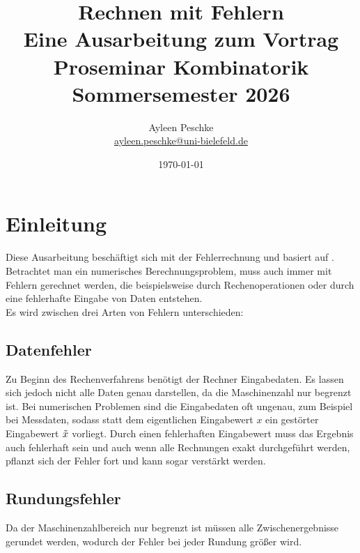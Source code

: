 \documentclass[12pt]{article}
\title{Rechnen mit Fehlern \\ [0.5em] \Large Eine Ausarbeitung zum Vortrag \\ Proseminar Kombinatorik \\ Sommersemester 2026}
\author{Ayleen Peschke \\ \url{ayleen.peschke@uni-bielefeld.de}}
\date{\today}
\begin{document}
\maketitle
\thispagestyle{empty}
\newpage

\tableofcontents
\newpage
{}

\section{Einleitung}
Diese Ausarbeitung beschäftigt sich mit der Fehlerrechnung und basiert auf \cite{hougardy2018}. \\
Betrachtet man ein numerisches Berechnungsproblem, muss auch immer mit Fehlern gerechnet werden, die beispielsweise durch Rechenoperationen oder durch eine fehlerhafte Eingabe von Daten entstehen. \\
Es wird zwischen drei Arten von Fehlern unterschieden: 

\subsection*{Datenfehler}
Zu Beginn des Rechenverfahrens benötigt der Rechner Eingabedaten. Es lassen sich jedoch nicht alle Daten genau darstellen, da die Maschinenzahl nur begrenzt ist. Bei numerischen Problemen sind die Eingabedaten oft ungenau, zum Beispiel bei Messdaten, sodass statt dem eigentlichen Eingabewert $x$ ein gestörter Eingabewert $\Tilde{x}$ vorliegt. Durch einen fehlerhaften Eingabewert muss das Ergebnis auch fehlerhaft sein und auch wenn alle Rechnungen exakt durchgeführt werden, pflanzt sich der Fehler fort und kann sogar verstärkt werden. 

\subsection*{Rundungsfehler}
Da der Maschinenzahlbereich nur begrenzt ist müssen alle Zwischenergebnisse gerundet werden, wodurch der Fehler bei jeder Rundung größer wird. 
\end{document}
